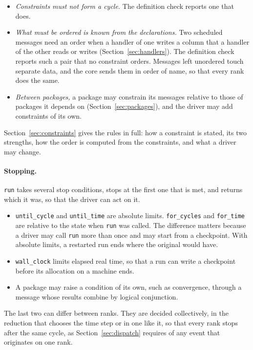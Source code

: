 \documentclass[11pt,a4paper]{article}
\newcommand{\code}[1]{\texttt{#1}}
\begin{document}
\begin{itemize}
  \item \emph{Constraints must not form a cycle.}  The definition check
        reports one that does.
  \item \emph{What must be ordered is known from the declarations.}  Two
        scheduled messages need an order when a handler of one writes a
        column that a handler of the other reads or writes
        (Section~\ref{sec:handlers}).  The definition check reports such a
        pair that no constraint orders.  Messages left unordered touch
        separate data, and the core sends them in order of name, so that
        every rank does the same.
  \item \emph{Between packages,} a package may constrain its messages
        relative to those of packages it depends on
        (Section~\ref{sec:packages}), and the driver may add constraints of
        its own.
\end{itemize}

Section~\ref{sec:constraints} gives the rules in full: how a constraint is
stated, its two strengths, how the order is computed from the constraints,
and what a driver may change.

\paragraph{Stopping.}  \code{run} takes several stop conditions, stops at
the first one that is met, and returns which it was, so that the driver can
act on it.

\begin{itemize}
  \item \code{until\_cycle} and \code{until\_time} are absolute limits.
        \code{for\_cycles} and \code{for\_time} are relative to the state
        when \code{run} was called.  The difference matters because a driver
        may call \code{run} more than once and may start from a checkpoint.
        With absolute limits, a restarted run ends where the original would
        have.
  \item \code{wall\_clock} limits elapsed real time, so that a run can write
        a checkpoint before its allocation on a machine ends.
  \item A package may raise a condition of its own, such as convergence,
        through a message whose results combine by logical conjunction.
\end{itemize}

The last two can differ between ranks.  They are decided collectively, in
the reduction that chooses the time step or in one like it, so that every
rank stops after the same cycle, as Section~\ref{sec:dispatch} requires of
any event that originates on one rank.
\end{document}
